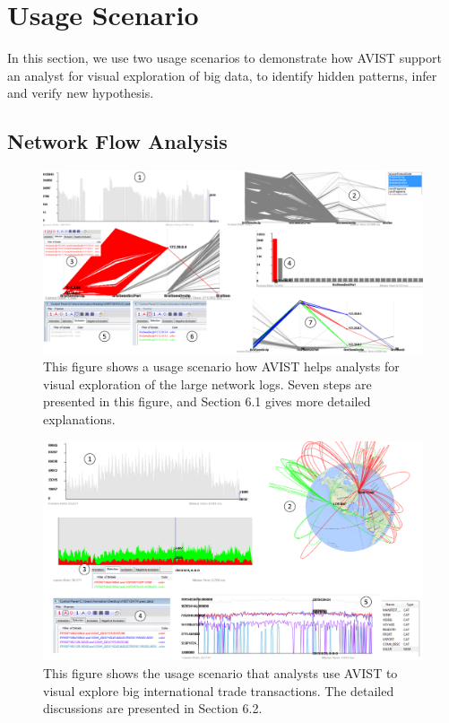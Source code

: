 
\section{Usage Scenario}

In this section, we use two usage scenarios to demonstrate how AVIST support an analyst for visual exploration of big data, to identify hidden patterns, infer and verify new hypothesis.


\subsection{Network Flow Analysis} %

\begin{figure}[htb]
	\centering
	\includegraphics[width=0.9\linewidth]{pic/network2.png}
	\parbox[t]{1.0\columnwidth}{\relax
	}
	\caption{\label{fig:vast}
		This figure shows a usage scenario how AVIST helps analysts for visual exploration of the large network logs. 
		Seven steps are presented in this figure, and Section 6.1 gives more detailed explanations. }
\end{figure}

\begin{figure}[htb]
	\centering
	\includegraphics[width=1.0\linewidth]{pic/worldtrade2.png}
	\parbox[t]{1.0\columnwidth}{\relax
	}
	\caption{\label{fig:network}
		This figure shows the usage scenario that analysts use AVIST to visual explore big international trade transactions. The detailed discussions are presented in Section 6.2.}
\end{figure}

